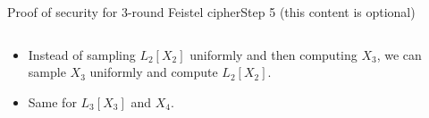 \documentclass[aspectratio=169, lualatex, handout]{beamer}
\begin{document}
	\begin{frame}{Proof of security for 3-round Feistel cipher}{Step 5 (this content is optional)}
		\begin{columns}[c]
			\begin{column}{0.5\textwidth}
				\begin{itemize}[<+->]
					\item Instead of sampling $L_2[X_2]$ uniformly and then computing $X_3$, we can sample $X_3$ uniformly and compute $L_2[X_2]$.
					\item Same for $L_3[X_3]$ and $X_4$.
				\end{itemize}
			\end{column}
			\begin{column}{0.5\textwidth}
				\vspace{-1.5cm}
				\begin{center}
				\end{center}
			\end{column}
		\end{columns}
	\end{frame}
\end{document}
